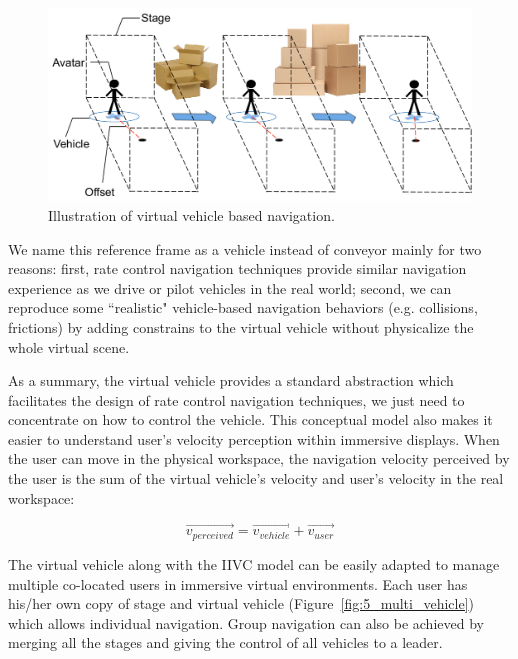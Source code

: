 \begin{figure}[htb]
  \centering
  \includegraphics[width=.9\textwidth]{figures/ch5/vehicle}
  \caption{\label{fig:5_vehicle}Illustration of virtual vehicle based navigation.}
\end{figure}

We name this reference frame as a vehicle instead of conveyor mainly for two reasons: first, rate control navigation techniques provide similar navigation experience as we drive or pilot vehicles in the real world; second, we can reproduce some ``realistic" vehicle-based navigation behaviors (e.g. collisions, frictions) by adding constrains to the virtual vehicle without physicalize the whole virtual scene.

As a summary, the virtual vehicle provides a standard abstraction which facilitates the design of rate control navigation techniques, we just need to concentrate on how to control the vehicle. This conceptual model also makes it easier to understand user's velocity perception within immersive displays. When the user can move in the physical workspace, the navigation velocity perceived by the user is the sum of the virtual vehicle's velocity and user's velocity in the real workspace: 

\begin{equation}
\overrightarrow{v_{perceived}} = \overrightarrow{v_{vehicle}} + \overrightarrow{v_{user}}
\end{equation}

The virtual vehicle along with the IIVC model can be easily adapted to manage multiple co-located users in immersive virtual environments. Each user has his/her own copy of stage and virtual vehicle (Figure~\ref{fig:5_multi_vehicle}) which allows individual navigation. Group navigation can also be achieved by merging all the stages and giving the control of all vehicles to a leader. 

